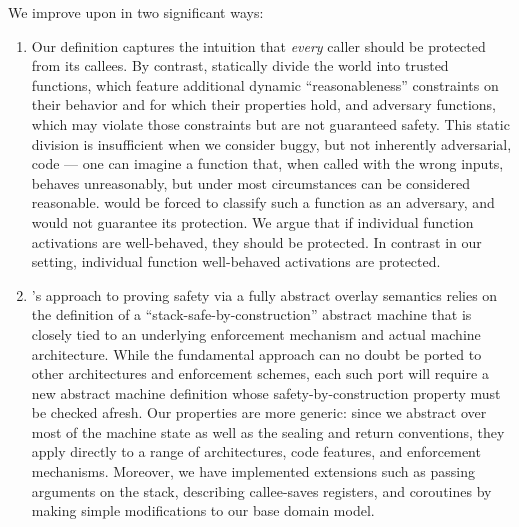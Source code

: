 \documentclass[acmsmall,review,anonymous]{acmart}\settopmatter{printfolios=true,printccs=false,printacmref=false}
\begin{document}
{We improve upon \citet{SkorstengaardSTKJFP} in two significant ways:
\begin{enumerate}[label=(\roman*)]
\item Our definition captures the intuition that {\em
  every} caller should be protected from its callees.  By contrast,
\citet{SkorstengaardSTKJFP}
statically divide the world into trusted functions, which feature additional
dynamic ``reasonableness'' constraints on their behavior and for which their
properties hold, and adversary functions, which may violate those
constraints but are not guaranteed safety. This static division
is insufficient when we consider buggy, but not inherently adversarial,
code --- one can imagine a function that, when called with the wrong
inputs, behaves unreasonably, but under most circumstances can be
considered reasonable. \citet{SkorstengaardSTKJFP} would be forced
to classify such a function as an adversary, and would not guarantee its
protection.
We argue that if individual function activations are well-behaved,
they should be protected.
In contrast in our setting, individual function well-behaved activations are protected.

\item \citet{SkorstengaardSTKJFP}'s approach to proving safety via a fully
  abstract overlay
  semantics relies on the definition of a ``stack-safe-by-construction''
  abstract machine that is closely tied to an underlying enforcement
  mechanism and actual machine architecture.
  While the fundamental approach can no doubt be ported to other architectures and enforcement
  schemes, each such port will require a new abstract machine definition whose
  safety-by-construction property must be checked afresh.
  Our properties are more generic: since we abstract over most of the machine
  state as well as the sealing and return conventions, they apply directly
  to a range of architectures, code features, and enforcement mechanisms.
  Moreover, we have implemented extensions such as passing arguments on the stack,
  describing callee-saves registers, and coroutines by making simple modifications
  to our base domain model.


\end{enumerate}}
\end{document}
